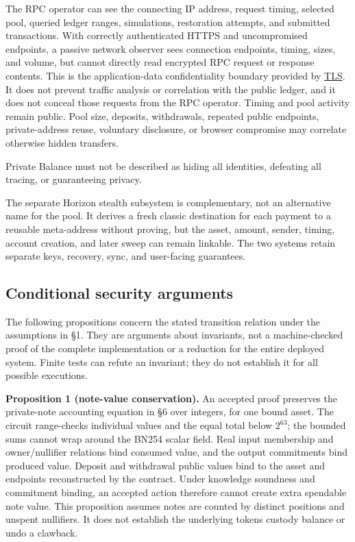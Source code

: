 \documentclass[11pt,letterpaper]{article}
\begin{document}
The RPC operator can see the connecting IP address, request timing,
selected pool, queried ledger ranges, simulations, restoration attempts,
and submitted transactions. With correctly authenticated HTTPS and
uncompromised endpoints, a passive network observer sees connection
endpoints, timing, sizes, and volume, but cannot directly read encrypted
RPC request or response contents. This is the application-data
confidentiality boundary provided by
\href{https://www.rfc-editor.org/rfc/rfc8446\#section-5.2}{TLS}. It does
not prevent traffic analysis or correlation with the public ledger, and
it does not conceal those requests from the RPC operator. Timing and
pool activity remain public. Pool size, deposits, withdrawals, repeated
public endpoints, private-address reuse, voluntary disclosure, or
browser compromise may correlate otherwise hidden transfers.

Private Balance must not be described as hiding all identities,
defeating all tracing, or guaranteeing privacy.

The separate Horizon stealth subsystem is complementary, not an
alternative name for the pool. It derives a fresh classic destination
for each payment to a reusable meta-address without proving, but the
asset, amount, sender, timing, account creation, and later sweep can
remain linkable. The two systems retain separate keys, recovery, sync,
and user-facing guarantees.

\subsection{Conditional security
arguments}\label{conditional-security-arguments}

The following propositions concern the stated transition relation under
the assumptions in \S{}1. They are arguments about invariants, not a
machine-checked proof of the complete implementation or a reduction for
the entire deployed system. Finite tests can refute an invariant; they
do not establish it for all possible executions.

\textbf{Proposition 1 (note-value conservation).} An accepted proof
preserves the private-note accounting equation in \S{}6 over integers, for
one bound asset. The circuit range-checks individual values and the
equal total below \(2^{63}\); the bounded sums cannot wrap around the
BN254 scalar field. Real input membership and
owner/\allowbreak{}nullifier relations bind consumed value, and the
output commitments bind produced value. Deposit and withdrawal public
values bind to the asset and endpoints reconstructed by the contract.
Under knowledge soundness and commitment binding, an accepted action
therefore cannot create extra spendable note value. This proposition
assumes notes are counted by distinct positions and unspent nullifiers.
It does not establish the underlying token\textquotesingle s custody
balance or undo a clawback.
\end{document}
